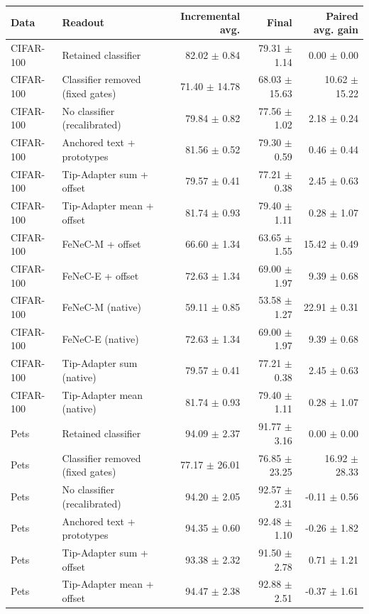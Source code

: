 \begin{tabular}{llrrr}
\toprule
Data & Readout & Incremental avg. & Final & Paired avg. gain \\
\midrule
CIFAR-100 & Retained classifier & 82.02 $\pm$ 0.84 & 79.31 $\pm$ 1.14 & 0.00 $\pm$ 0.00 \\
CIFAR-100 & Classifier removed (fixed gates) & 71.40 $\pm$ 14.78 & 68.03 $\pm$ 15.63 & 10.62 $\pm$ 15.22 \\
CIFAR-100 & No classifier (recalibrated) & 79.84 $\pm$ 0.82 & 77.56 $\pm$ 1.02 & 2.18 $\pm$ 0.24 \\
CIFAR-100 & Anchored text + prototypes & 81.56 $\pm$ 0.52 & 79.30 $\pm$ 0.59 & 0.46 $\pm$ 0.44 \\
CIFAR-100 & Tip-Adapter sum + offset & 79.57 $\pm$ 0.41 & 77.21 $\pm$ 0.38 & 2.45 $\pm$ 0.63 \\
CIFAR-100 & Tip-Adapter mean + offset & 81.74 $\pm$ 0.93 & 79.40 $\pm$ 1.11 & 0.28 $\pm$ 1.07 \\
CIFAR-100 & FeNeC-M + offset & 66.60 $\pm$ 1.34 & 63.65 $\pm$ 1.55 & 15.42 $\pm$ 0.49 \\
CIFAR-100 & FeNeC-E + offset & 72.63 $\pm$ 1.34 & 69.00 $\pm$ 1.97 & 9.39 $\pm$ 0.68 \\
CIFAR-100 & FeNeC-M (native) & 59.11 $\pm$ 0.85 & 53.58 $\pm$ 1.27 & 22.91 $\pm$ 0.31 \\
CIFAR-100 & FeNeC-E (native) & 72.63 $\pm$ 1.34 & 69.00 $\pm$ 1.97 & 9.39 $\pm$ 0.68 \\
CIFAR-100 & Tip-Adapter sum (native) & 79.57 $\pm$ 0.41 & 77.21 $\pm$ 0.38 & 2.45 $\pm$ 0.63 \\
CIFAR-100 & Tip-Adapter mean (native) & 81.74 $\pm$ 0.93 & 79.40 $\pm$ 1.11 & 0.28 $\pm$ 1.07 \\
\midrule
Pets & Retained classifier & 94.09 $\pm$ 2.37 & 91.77 $\pm$ 3.16 & 0.00 $\pm$ 0.00 \\
Pets & Classifier removed (fixed gates) & 77.17 $\pm$ 26.01 & 76.85 $\pm$ 23.25 & 16.92 $\pm$ 28.33 \\
Pets & No classifier (recalibrated) & 94.20 $\pm$ 2.05 & 92.57 $\pm$ 2.31 & -0.11 $\pm$ 0.56 \\
Pets & Anchored text + prototypes & 94.35 $\pm$ 0.60 & 92.48 $\pm$ 1.10 & -0.26 $\pm$ 1.82 \\
Pets & Tip-Adapter sum + offset & 93.38 $\pm$ 2.32 & 91.50 $\pm$ 2.78 & 0.71 $\pm$ 1.21 \\
Pets & Tip-Adapter mean + offset & 94.47 $\pm$ 2.38 & 92.88 $\pm$ 2.51 & -0.37 $\pm$ 1.61 \\

\end{tabular}
